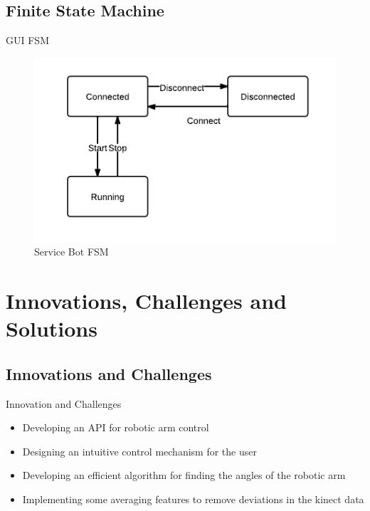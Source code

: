 \documentclass{beamer}
\begin{document}
\subsection{Finite State Machine}
\begin{frame}{GUI FSM}
\begin{figure}
\centerline{\includegraphics[scale=0.7]{images/guifsm.png}}
\caption{Service Bot FSM}\label{fig:exp}
\end{figure}
\end{frame}

\section{Innovations, Challenges and Solutions}
\subsection{Innovations and Challenges}
\begin{frame}{Innovation and Challenges}
\begin{itemize}
\item Developing an API for robotic arm control 
\item Designing an intuitive control mechanism for the user
\item Developing an efficient algorithm for finding the angles of the robotic arm
\item Implementing some averaging features to remove deviations in the kinect data
\end{itemize}
\end{frame}
\end{document}

